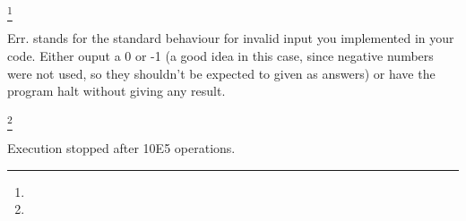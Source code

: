 \documentclass[11pt]{article} %
\begin{document}
\noindent
\begin{table}[H]
\small

\footnote[1]{}{\begin{footnotesize}Err. stands for the standard behaviour for invalid input you implemented in your code. Either ouput a 0 or -1 (a good idea in this case, since negative numbers were not used, so they shouldn't be expected to given as answers) or have the program halt without giving any result. \end{footnotesize}}
\footnote[2]{}{\begin{footnotesize}Execution stopped after 10E5 operations. \end{footnotesize}}
\end{table}
  \normalsize
  
\end{document}
